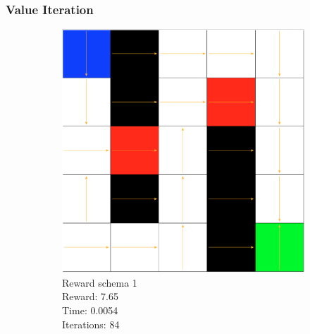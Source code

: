 \documentclass[a4paper,10pt]{article}
\begin{document}
\subsubsection{Value Iteration}
\begin{figure}[H]
        \centering
        \begin{subfigure}[b]{0.3\textwidth}
                \includegraphics[width=\textwidth]{figures/5x5_viter_r1.png}
                \caption{Reward schema 1\\
                Reward:  7.65\\
                Time:  0.0054\\
                Iterations: 84}
                \label{fig:v1}
        \end{subfigure}%
        ~ %
        \begin{subfigure}[b]{0.3\textwidth}

\end{subfigure}
\end{figure}
\end{document}

